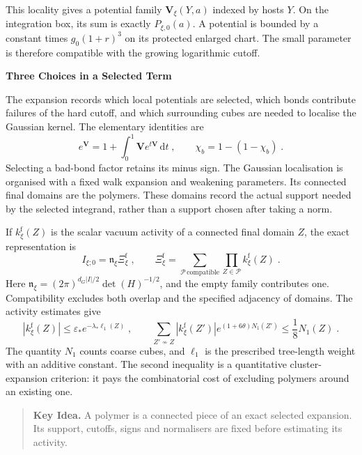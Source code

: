 \documentclass[11pt,a4paper]{article}
\newcommand{\dd}{\mathrm{d}}
\newcommand{\subhead}[1]{\par\vspace{4pt}\textbf{\color{ink}#1}\par}
\newcommand{\idea}[1]{\begin{quote}\small\textbf{Key Idea.} #1\end{quote}}
\begin{document}
This locality gives a potential family $\mathbf V_\xi(Y,a)$ indexed by hosts $Y$. On the integration box, its sum is exactly $P_{\xi,0}(a)$. A potential is bounded by a constant times $g_0(1+r)^3$ on its protected enlarged chart. The small parameter is therefore compatible with the growing logarithmic cutoff.

\subhead{Three Choices in a Selected Term}
The expansion records which local potentials are selected, which bonds contribute failures of the hard cutoff, and which surrounding cubes are needed to localise the Gaussian kernel. The elementary identities are
\begin{equation*}
    e^{\mathbf V}=1+\int_0^1\mathbf V e^{t\mathbf V}\,\dd t\;,
    \qquad \chi_b=1-(1-\chi_b)\;.
\end{equation*}
Selecting a bad-bond factor retains its minus sign. The Gaussian localisation is organised with a fixed walk expansion and weakening parameters. Its connected final domains are the polymers. These domains record the actual support needed by the selected integrand, rather than a support chosen after taking a norm.

If $k^{\mathrm f}_\xi(Z)$ is the scalar vacuum activity of a connected final domain $Z$, the exact representation is
\begin{equation*}
    I_{\xi;0}=\mathfrak n_\xi\Xi^{\mathrm f}_\xi\;,
    \qquad
    \Xi^{\mathrm f}_\xi
        =\sum_{\mathcal P\,\mathrm{compatible}}
            \prod_{Z\in \mathcal P}k^{\mathrm f}_\xi(Z)\;.
\end{equation*}
Here $\mathfrak n_\xi=(2\pi)^{d_G|I|/2}\det (H)^{-1/2}$, and the empty family contributes one. Compatibility excludes both overlap and the specified adjacency of domains. The activity estimates give
\begin{equation*}
    |k^{\mathrm f}_\xi(Z)|\leqslant  \varepsilon_*e^{-\lambda_*\ell_1(Z)}\;,
    \qquad
    \sum_{Z'\not\sim Z}|k^{\mathrm f}_\xi(Z')|
        e^{(1+6\theta)N_1(Z')}\leqslant  \frac{1}{8}N_1(Z)\;.
\end{equation*}
The quantity $N_1$ counts coarse cubes, and $\ell_1$ is the prescribed tree-length weight with an additive constant. The second inequality is a quantitative cluster-expansion criterion: it pays the combinatorial cost of excluding polymers around an existing one.

\idea{A polymer is a connected piece of an exact selected expansion. Its support, cutoffs, signs and normalisers are fixed before estimating its activity.}
\end{document}
